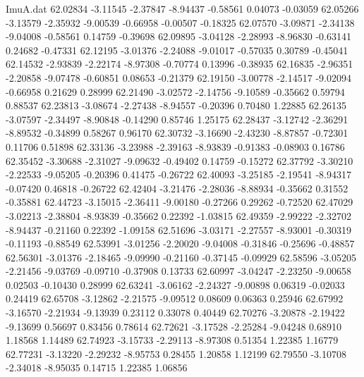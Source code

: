 \begin{filecontents}{ImuA.dat}
  62.02834   -3.11545   -2.37847   -8.94437   -0.58561    0.04073   -0.03059
  62.05266   -3.13579   -2.35932   -9.00539   -0.66958   -0.00507   -0.18325
  62.07570   -3.09871   -2.34138   -9.04008   -0.58561    0.14759   -0.39698
  62.09895   -3.04128   -2.28993   -8.96830   -0.63141    0.24682   -0.47331
  62.12195   -3.01376   -2.24088   -9.01017   -0.57035    0.30789   -0.45041
  62.14532   -2.93839   -2.22174   -8.97308   -0.70774    0.13996   -0.38935
  62.16835   -2.96351   -2.20858   -9.07478   -0.60851    0.08653   -0.21379
  62.19150   -3.00778   -2.14517   -9.02094   -0.66958    0.21629    0.28999
  62.21490   -3.02572   -2.14756   -9.10589   -0.35662    0.59794    0.88537
  62.23813   -3.08674   -2.27438   -8.94557   -0.20396    0.70480    1.22885
  62.26135   -3.07597   -2.34497   -8.90848   -0.14290    0.85746    1.25175
  62.28437   -3.12742   -2.36291   -8.89532   -0.34899    0.58267    0.96170
  62.30732   -3.16690   -2.43230   -8.87857   -0.72301    0.11706    0.51898
  62.33136   -3.23988   -2.39163   -8.93839   -0.91383   -0.08903    0.16786
  62.35452   -3.30688   -2.31027   -9.09632   -0.49402    0.14759   -0.15272
  62.37792   -3.30210   -2.22533   -9.05205   -0.20396    0.41475   -0.26722
  62.40093   -3.25185   -2.19541   -8.94317   -0.07420    0.46818   -0.26722
  62.42404   -3.21476   -2.28036   -8.88934   -0.35662    0.31552   -0.35881
  62.44723   -3.15015   -2.36411   -9.00180   -0.27266    0.29262   -0.72520
  62.47029   -3.02213   -2.38804   -8.93839   -0.35662    0.22392   -1.03815
  62.49359   -2.99222   -2.32702   -8.94437   -0.21160    0.22392   -1.09158
  62.51696   -3.03171   -2.27557   -8.93001   -0.30319   -0.11193   -0.88549
  62.53991   -3.01256   -2.20020   -9.04008   -0.31846   -0.25696   -0.48857
  62.56301   -3.01376   -2.18465   -9.09990   -0.21160   -0.37145   -0.09929
  62.58596   -3.05205   -2.21456   -9.03769   -0.09710   -0.37908    0.13733
  62.60997   -3.04247   -2.23250   -9.00658    0.02503   -0.10430    0.28999
  62.63241   -3.06162   -2.24327   -9.00898    0.06319   -0.02033    0.24419
  62.65708   -3.12862   -2.21575   -9.09512    0.08609    0.06363    0.25946
  62.67992   -3.16570   -2.21934   -9.13939    0.23112    0.33078    0.40449
  62.70276   -3.20878   -2.19422   -9.13699    0.56697    0.83456    0.78614
  62.72621   -3.17528   -2.25284   -9.04248    0.68910    1.18568    1.14489
  62.74923   -3.15733   -2.29113   -8.97308    0.51354    1.22385    1.16779
  62.77231   -3.13220   -2.29232   -8.95753    0.28455    1.20858    1.12199
  62.79550   -3.10708   -2.34018   -8.95035    0.14715    1.22385    1.06856

\end{filecontents}
